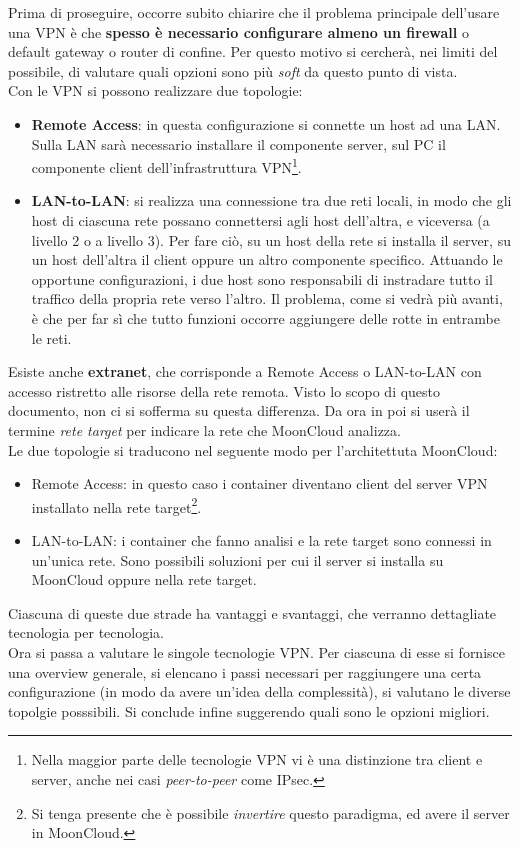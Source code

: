 Prima di proseguire, occorre subito chiarire che il problema principale dell'usare una VPN
è che \textbf{spesso è necessario configurare almeno un firewall} o default gateway o router di
confine. Per questo motivo
si cercherà, nei limiti del possibile, di valutare quali opzioni sono più \textit{soft}
da questo punto di vista.\\
Con le VPN si possono realizzare due topologie:
\begin{itemize}
  \item \textbf{Remote Access}: in questa configurazione si connette un host ad una LAN.
  Sulla LAN sarà necessario installare il componente server, sul PC il componente client
  dell'infrastruttura VPN\footnote{Nella maggior parte delle tecnologie VPN vi è una distinzione
  tra client e server, anche nei casi \textit{peer-to-peer} come IPsec.}.
  \item \textbf{LAN-to-LAN}: si realizza una connessione tra due reti locali, in modo che gli
  host di ciascuna rete possano connettersi agli host dell'altra, e viceversa (a livello 2
  o a livello 3). Per fare ciò, su un host della rete si installa il server, su un host
  dell'altra il client oppure un altro componente specifico. Attuando le opportune configurazioni, i due host sono responsabili
  di instradare tutto il traffico della propria rete verso l'altro. Il problema, come si vedrà
  più avanti, è che per far sì che tutto funzioni occorre aggiungere delle rotte in entrambe le
  reti.
\end{itemize}
Esiste anche \textbf{extranet}, che corrisponde a Remote Access o LAN-to-LAN con accesso ristretto alle
risorse della rete remota. Visto lo scopo di questo documento, non ci si sofferma su questa differenza.
Da ora in poi si userà il termine \textit{rete target} per indicare la rete che MoonCloud analizza.\\
Le due topologie si traducono nel seguente modo per l'architettuta MoonCloud:
\begin{itemize}
  \item Remote Access: in questo caso i container diventano client del server VPN installato nella rete
  target\footnote{Si tenga presente che è
  possibile \textit{invertire} questo paradigma, ed avere il server in MoonCloud.}.
  \item LAN-to-LAN: i container che fanno analisi e la rete target sono connessi in un'unica rete.
  Sono possibili soluzioni per cui il server si installa su MoonCloud oppure nella rete target.
\end{itemize}
Ciascuna di queste due strade ha vantaggi e svantaggi, che verranno dettagliate tecnologia per tecnologia.\\
Ora si passa a valutare le singole tecnologie VPN. Per ciascuna di esse si fornisce una overview
generale, si elencano i passi necessari per raggiungere una certa configurazione
(in modo da avere un'idea della complessità), si valutano le diverse topolgie posssibili. Si conclude
infine suggerendo quali sono le opzioni migliori.


